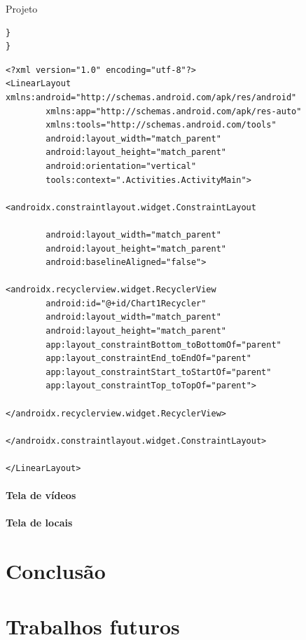 \documentclass[
	12pt,				%
	openright,			%
	twoside,			%
	a4paper,			%
	english,			%
	french,				%
	spanish,			%
	brazil				%
	]{abntex2}
\begin{document}
\begin{chapter}{Projeto}
\begin{lstlisting}[numbers=none,basicstyle=\small,
caption={FragmentStatistics.java},
title={FragmentStatistics.java},
label={FragmentStatistics.java}]
}
}
\end{lstlisting}

\begin{lstlisting}[numbers=none,basicstyle=\small,
caption={FragmentStatistics.xml},
title={FragmentStatistics.xml},
label={FragmentStatistics.xml}]
<?xml version="1.0" encoding="utf-8"?>
<LinearLayout xmlns:android="http://schemas.android.com/apk/res/android"
		xmlns:app="http://schemas.android.com/apk/res-auto"
		xmlns:tools="http://schemas.android.com/tools"
		android:layout_width="match_parent"
		android:layout_height="match_parent"
		android:orientation="vertical"
		tools:context=".Activities.ActivityMain">

<androidx.constraintlayout.widget.ConstraintLayout

		android:layout_width="match_parent"
		android:layout_height="match_parent"
		android:baselineAligned="false">

<androidx.recyclerview.widget.RecyclerView
		android:id="@+id/Chart1Recycler"
		android:layout_width="match_parent"
		android:layout_height="match_parent"
		app:layout_constraintBottom_toBottomOf="parent"
		app:layout_constraintEnd_toEndOf="parent"
		app:layout_constraintStart_toStartOf="parent"
		app:layout_constraintTop_toTopOf="parent">

</androidx.recyclerview.widget.RecyclerView>

</androidx.constraintlayout.widget.ConstraintLayout>

</LinearLayout>

\end{lstlisting}
\subsubsection{Tela de vídeos}
\subsubsection{Tela de locais}
\end{chapter}

\chapter{Conclusão}

\chapter{Trabalhos futuros}
\end{document}
